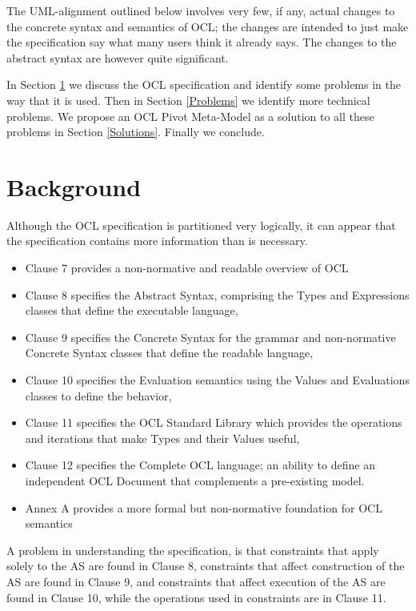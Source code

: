 \documentclass{eceasst}
\begin{document}
The UML-alignment outlined below involves very few, if any, actual changes to the concrete syntax and semantics of OCL; the changes are intended to just make the specification say what many users think it already says. The changes to the abstract syntax are however quite significant.

In Section \ref{Background} we discuss the OCL specification and identify some problems in the way that it is used. Then in Section \ref{Problems} we  identify more technical problems. We propose an OCL Pivot Meta-Model as a solution to all these problems in Section \ref{Solutions}. Finally we conclude. 

\section{Background}\label{Background}

Although the OCL specification is partitioned very logically, it can appear that the specification contains more information than is necessary.

\begin{itemize}
\item Clause 7 provides a non-normative and readable overview of OCL
\item Clause 8 specifies the Abstract Syntax, comprising the Types and Expressions classes that define the executable language, 
\item Clause 9 specifies the Concrete Syntax for the grammar and non-normative Concrete Syntax classes that define the readable language, 
\item Clause 10 specifies the Evaluation semantics using the Values and Evaluations classes to define the behavior, 
\item Clause 11 specifies the OCL Standard Library which provides the operations and iterations that make Types and their Values useful, 
\item Clause 12 specifies the Complete OCL language; an ability to define an independent OCL Document that complements a pre-existing model.
\item Annex A provides a more formal but non-normative foundation for OCL semantics
\end{itemize}

A problem in understanding the specification, is that constraints that apply solely to the AS are found in Clause 8, constraints that affect construction of the AS are found in Clause 9, and constraints that affect execution of the AS are found in Clause 10, while the operations used in constraints are in Clause 11.
\end{document}
